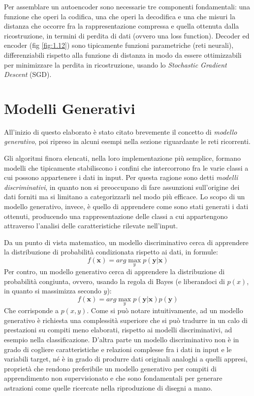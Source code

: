 Per assemblare un autoencoder sono necessarie tre componenti fondamentali: una funzione che operi la codifica, una che operi la decodifica e una che misuri la distanza che occorre fra la rappresentazione compressa e quella ottenuta dalla ricostruzione, in termini di perdita di dati (ovvero una loss function).
Decoder ed encoder (fig \ref{fig:1.12}) sono tipicamente funzioni parametriche (reti neurali), differenziabili rispetto alla funzione di distanza in modo da essere ottimizzabili per minimizzare la perdita in ricostruzione, usando lo \textit{Stochastic Gradient Descent} (SGD).
\section{Modelli Generativi} %
\label{sec:modelli_generativi}
All'inizio di questo elaborato è stato citato brevemente il concetto di \textit{modello generativo}, poi ripreso in alcuni esempi nella sezione riguardante le reti ricorrenti.

Gli algoritmi finora elencati, nella loro implementazione più semplice, formano modelli che tipicamente stabiliscono i confini che intercorrono fra le varie classi a cui possono appartenere i dati in input. Per questa ragione sono detti \textit{modelli discriminativi}, in quanto non si preoccupano di fare assunzioni sull'origine dei dati forniti ma si limitano a categorizzarli nel modo più efficace. Lo scopo di un modello generativo, invece, è quello di apprendere come sono stati generati i dati ottenuti, producendo una rappresentazione delle classi a cui appartengono attraverso l'analisi delle caratteristiche rilevate nell'input.

Da un punto di vista matematico, un modello discriminativo cerca di apprendere la distribuzione di probabilità condizionata rispetto ai dati, in formule: 
\begin{equation}
	\label{conditional}
	f(\boldsymbol{x}) = arg \max_y p(\boldsymbol{y}|\boldsymbol{x})
\end{equation}
Per contro, un modello generativo cerca di apprendere la distribuzione di probabilità congiunta, ovvero, usando la regola di Bayes (e liberandoci di $p(x)$, in quanto si massimizza secondo $y$):
\begin{equation}
	\label{joint}
	f(\boldsymbol{x}) = arg\max_y p(\boldsymbol{y}|\boldsymbol{x})p(\boldsymbol{y})
\end{equation}
Che corrisponde a $p(x, y)$. Come si può notare intuitivamente, ad un modello generativo è richiesta una complessità superiore che si può tradurre in un calo di prestazioni su compiti meno elaborati, rispetto ai modelli discriminativi, ad esempio nella classificazione. D'altra parte un modello discriminativo non è in grado di cogliere caratteristiche e relazioni complesse fra i dati in input e le variabili target, né è in grado di produrre dati originali analoghi a quelli appresi, proprietà che rendono preferibile un modello generativo per compiti di apprendimento non supervisionato e che sono fondamentali per generare astrazioni come quelle ricercate nella riproduzione di disegni a mano.
